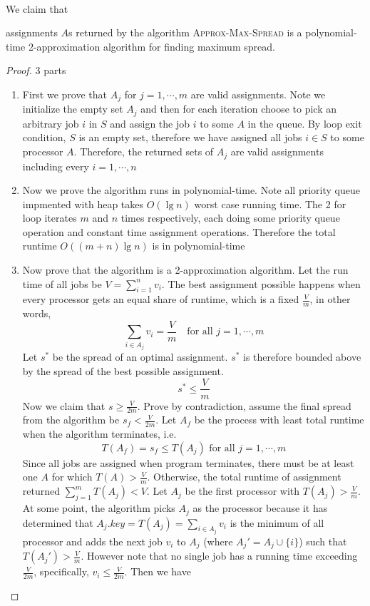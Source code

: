 \documentclass[11pt]{article}
\begin{document}
\begin{enumerate}
\begin{solution}
\begin{algorithm}[H]
{                \\
            }
        \end{algorithm}
        We claim that 
        \begin{center}
             assignments $A$s returned by the algorithm \textsc{Approx-Max-Spread} is a polynomial-time 2-approximation algorithm for finding maximum spread. 
        \end{center}
        \begin{proof}
            3 parts
            \begin{enumerate}
                \item First we prove that $A_j$ for $j=1,\cdots, m$ are valid assignments. Note we initialize the empty set $A_j$ and then for each iteration choose to pick an arbitrary job $i$ in $S$ and assign the job $i$ to some $A$ in the queue. By loop exit condition, $S$ is an empty set, therefore we have assigned all jobs $i\in S$ to some processor $A$. Therefore, the returned sets of $A_j$ are valid assignments including every $i=1,\cdots, n$
                \item Now we prove the algorithm runs in polynomial-time. Note all priority queue impmented with heap takes $O(\lg n)$ worst case running time. The 2 for loop iterates $m$ and $n$ times respectively, each doing some priority queue operation and constant time assignment operations. Therefore the total runtime $O((m+n)\lg n )$ is in polynomial-time
                \item Now prove that the algorithm is a 2-approximation algorithm. Let the run time of all jobs be $V = \sum_{i=1}^n v_i$. The best assignment possible happens when every processor gets an equal share of runtime, which is a fixed $\frac{V}{m}$, in other words, 
                \[
                    \sum_{i\in A_j} v_i= \frac{V}{m} \quad \text{for all } j = 1,\cdots ,m
                \]
                Let $s^*$ be the spread of an optimal assignment. $s^*$ is therefore bounded above by the spread of the best possible assignment. 
                \[
                    s^* \leq \frac{V}{m}
                \]
                Now we claim that $s \geq \frac{V}{2m}$. Prove by contradiction, assume the final spread from the algorithm be $s_f < \frac{V}{2m}$. Let $A_f$ be the process with least total runtime when the algorithm terminates, i.e. 
                \[
                    T(A_f) = s_f \leq T(A_j) \text{ for all } j = 1,\cdots, m
                \]
                Since all jobs are assigned when program terminates, there must be at least one $A$ for which $T(A) > \frac{V}{m}$. Otherwise, the total runtime of assignment returned $\sum_{j=1}^m T(A_j) < V$. Let $A_j$ be the first processor with $T(A_j) > \frac{V}{m}$. At some point, the algorithm picks $A_j$ as the processor because it has determined that $A_j.key = T(A_j) = \sum_{i\in A_j}  v_i$ is the minimum of all processor and adds the next job $v_i$ to $A_j$ (where $A_j' = A_j \cup \{i\}$) such that $T(A_j') > \frac{V}{m}$. However note that no single job has a running time exceeding $\frac{V}{2m}$, specifically, $v_i \leq \frac{V}{2m}$. Then we have

\end{enumerate}
\end{proof}
\end{solution}
\end{enumerate}
\end{document}
